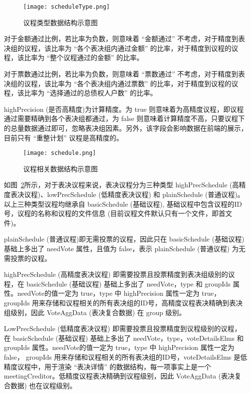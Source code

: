   \begin{figure}[!htp]
    \centering
    \texttt{[image: scheduleType.png]}
    \caption{议程类型数据结构示意图}
    \label{fig:scheduleType}
  \end{figure}

  对于金额通过比例，若比率为负数，则意味着 “金额通过” 不考虑，对于精度到表决组的议程，该比率为 “各个表决组内通过金额” 的比率，对于精度到议程的议程，该比率为 “整个议程通过的金额” 的比率。

  对于票数通过比例，若比率为负数，则意味着 “票数通过” 不考虑，对于精度到表决组的议程，该比率为 “各个表决组内通过票数” 的比率，对于精度到议程的议程，该比率为 “选择通过的总债权人户数” 的比率。

  highPrecision (是否高精度)为计算精度。为 true 则意味着为高精度议程，即议程通过需要精确到各个表决组都通过，为 false 则意味着计算精度不高，只要议程下的总量数据通过即可，忽略表决组因素。另外，该字段会影响数据在前端的展示，目前只有 “重整计划” 议程是高精度的。

    \begin{figure}[!htp]
      \centering
      \texttt{[image: schedule.png]}
      \caption{议程相关数据结构示意图}
      \label{fig:schedule}
    \end{figure}

    如图~\ref{fig:schedule}所示，对于表决议程来说，表决议程分为三种类型 highPrecSchedule (高精度表决议程)、lowPrecSchedule (低精度表决议程) 和 plainSchedule (普通议程)。以上三种类型议程均继承自 basicSchedule (基础议程), 基础议程中包含议程的ID号，议程的名称和议程的文件信息 (目前议程文件默认只有一个文件，即首文件)。

  plainSchedule (普通议程)即无需投票的议程，因此只在 basicSchedule (基础议程) 基础上多出了 needVote 属性，且值为 false，表示 plainSchedule (普通议程) 为无需投票的议程。

  highPrecSchedule (高精度表决议程) 即需要投票且投票精度到表决组级别的议程，在 basicSchedule (基础议程) 基础上多出了 needVote，type 和 groupIds 属性。needVote的值一定为 true，type 中 highPrecision 属性一定为 true， groupIds 用来存储和议程相关的所有表决组的ID号，高精度议程表决精确到表决组级别，因此 VoteAggData (表决复合数据) 在 group 级别。

  LowPrecSchedule (低精度表决议程) 即需要投票且投票精度到议程级别的议程，在 basicSchedule (基础议程) 基础上多出了 needVote，type，voteDetailsElms 和 groupIds 属性。needVote的值一定为 true，type 中 highPrecision 属性一定为 false， groupIds 用来存储和议程相关的所有表决组的ID号，voteDetailsElms 是低精度议程中，用于渲染 “表决详情” 的数据结构，每一项事实上是一个 meetingCreditor。低精度议程表决精确到议程级别，因此 VoteAggData (表决复合数据) 也在议程级别。

